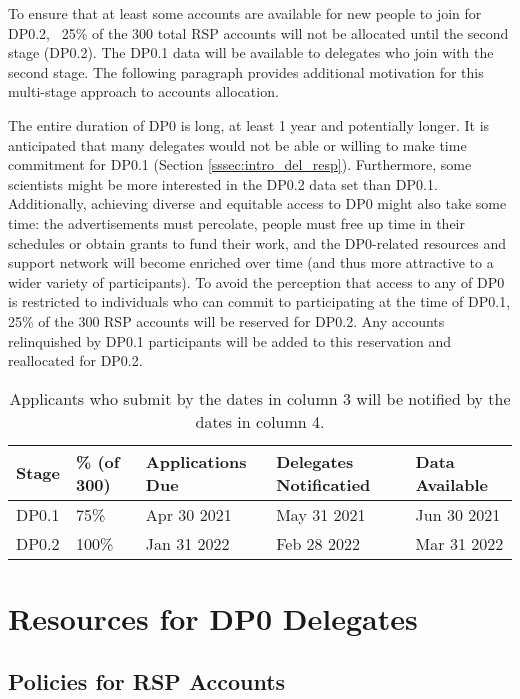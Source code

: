 \documentclass[DM,lsstdraft,authoryear,toc]{lsstdoc}
\begin{document}
To ensure that at least some accounts are available for new people to join for DP0.2, ~25\% of the 300 total RSP accounts will not be allocated until the second stage (DP0.2).
The DP0.1 data will be available to delegates who join with the second stage.
The following paragraph provides additional motivation for this multi-stage approach to accounts allocation.

The entire duration of DP0 is long, at least 1 year and potentially longer.
It is anticipated that many delegates would not be able or willing to make time commitment for DP0.1 (Section \ref{sssec:intro_del_resp}).
Furthermore, some scientists might be more interested in the DP0.2 data set than DP0.1.
Additionally, achieving diverse and equitable access to DP0 might also take some time: the advertisements must percolate, people must free up time in their schedules or obtain grants to fund their work, and the DP0-related resources and support network will become enriched over time (and thus more attractive to a wider variety of participants).
To avoid the perception that access to any of DP0 is restricted to individuals who can commit to participating at the time of DP0.1, 25\% of the 300 RSP accounts will be reserved for DP0.2.
Any accounts relinquished by DP0.1 participants will be added to this reservation and reallocated for DP0.2.

\begin{table}[!h]
\centering
\caption{Applicants who submit by the dates in column 3 will be notified by the dates in column 4.}\label{tab:selection_timeline}
\begin{tabular}{lllll}
\hline
Stage & \% (of 300) & Applications Due & Delegates Notificatied & Data Available \\
\hline \hline
DP0.1 & 75\%    &  Apr 30 2021   &  May 31 2021  &  Jun 30 2021 \\
DP0.2 & 100\%  &  Jan 31 2022   &  Feb 28 2022  &  Mar 31 2022 \\
\hline
\end{tabular}
\end{table}


\section{Resources for DP0 Delegates}\label{sec:res}

\subsection{Policies for RSP Accounts}\label{ssec:res_pol}
\end{document}
